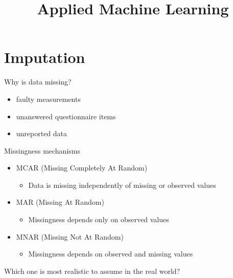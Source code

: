 \documentclass[11pt,compress,t,notes=noshow, aspectratio=169, xcolor=table]{beamer}
\title{Applied Machine Learning}
\date{}
\begin{document}
\newcommand{\titlefigure}{figure/empty}
\newcommand{\learninggoals}{
\item Imputation}


\section{Imputation}

\begin{frame}{Why is data missing? \href{https://arxiv.org/pdf/2407.19804}{}}
    \vfill
    \begin{itemize}
        \item faulty measurements
        \item unanswered questionnaire items
        \item unreported data
    \end{itemize}
    \vfill
\end{frame}
\begin{frame}{Missingness mechanisms}
    \vfill
    \begin{itemize}
        \item MCAR (Missing Completely At Random)
        \begin{itemize}
            \item Data is missing independently of missing or observed values
        \end{itemize}
        \item MAR (Missing At Random)
        \begin{itemize}
            \item Missingness depends only on observed values
        \end{itemize}
        \item MNAR (Missing Not At Random)
        \begin{itemize}
            \item Missingness depends on observed and missing values
        \end{itemize}
    \end{itemize}    
    \vfill
    \pause
    Which one is most realistic to assume in the real world?
    \vfill
\end{frame}
\end{document}
